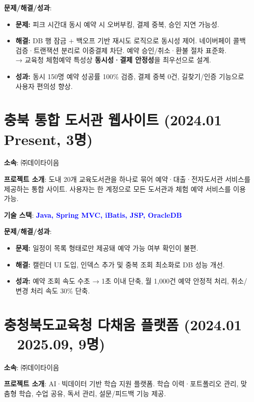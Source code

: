 \documentclass[a4paper,11pt]{article}
\newcommand{\tech}[1]{\textbf{\textcolor{blue}{#1}}}
\begin{document}
\textbf{문제/해결/성과}:
\begin{itemize}[leftmargin=*]
  \item \textbf{문제:} 피크 시간대 동시 예약 시 오버부킹, 결제 중복, 승인 지연 가능성.
  \item \textbf{해결:} DB 행 잠금 + 백오프 기반 재시도 로직으로 동시성 제어. 네이버페이 콜백 검증·트랜잭션 분리로 이중결제 차단. 예약 승인/취소·환불 절차 표준화. \\
  → 교육청 체험예약 특성상 \textbf{동시성·결제 안정성}을 최우선으로 설계.
  \item \textbf{성과:} 동시 150명 예약 성공률 100\% 검증, 결제 중복 0건, 길찾기/인증 기능으로 사용자 편의성 향상.
\end{itemize}

\section{충북 통합 도서관 웹사이트 (2024.01 ~ Present, 3명)}

\textbf{소속}: ㈜데이타이음  

\textbf{프로젝트 소개}:  
도내 20개 교육도서관을 하나로 묶어 예약·대출·전자도서관 서비스를 제공하는 통합 사이트.  
사용자는 한 계정으로 모든 도서관과 체험 예약 서비스를 이용 가능.  

\textbf{기술 스택}: \tech{Java, Spring MVC, iBatis, JSP, OracleDB}  

\textbf{문제/해결/성과}:
\begin{itemize}[leftmargin=*]
  \item \textbf{문제:} 일정이 목록 형태로만 제공돼 예약 가능 여부 확인이 불편.
  \item \textbf{해결:} 캘린더 UI 도입, 인덱스 추가 및 중복 조회 최소화로 DB 성능 개선.
  \item \textbf{성과:} 예약 조회 속도 수초 → 1초 이내 단축, 월 1,000건 예약 안정적 처리, 취소/변경 처리 속도 30\% 단축.
\end{itemize}

\section{충청북도교육청 다채움 플랫폼 (2024.01 ~ 2025.09, 9명)}

\textbf{소속}: ㈜데이타이음  

\textbf{프로젝트 소개}:  
AI·빅데이터 기반 학습 지원 플랫폼.  
학습 이력·포트폴리오 관리, 맞춤형 학습, 수업 공유, 독서 관리, 설문/피드백 기능 제공.  
\end{document}

